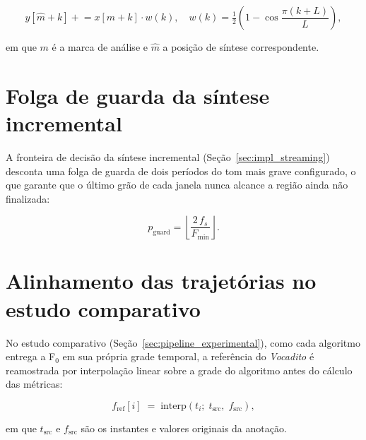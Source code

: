 \begin{equation}
y[\hat{m} + k] \mathrel{+}= x[m + k] \cdot w(k), \quad
w(k) = \tfrac{1}{2}\!\left(1 - \cos\!\frac{\pi(k+L)}{L}\right),
\end{equation}

\noindent em que $m$ é a marca de análise e $\hat{m}$ a posição de síntese
correspondente.

\section{\label{ap:guarda}Folga de guarda da síntese incremental}

A fronteira de decisão da síntese incremental (Seção~\ref{sec:impl_streaming})
desconta uma folga de guarda de dois períodos do tom mais grave configurado, o que
garante que o último grão de cada janela nunca alcance a região ainda não
finalizada:

\begin{equation}
p_{\text{guard}} = \left\lfloor \frac{2\, f_s}{F_{\min}} \right\rfloor .
\end{equation}

\section{\label{ap:alinhamento}Alinhamento das trajetórias no estudo comparativo}

No estudo comparativo (Seção~\ref{sec:pipeline_experimental}), como cada algoritmo
entrega a F$_0$ em sua própria grade temporal, a referência do \textit{Vocadito} é
reamostrada por interpolação linear sobre a grade do algoritmo antes do cálculo das
métricas:

\begin{equation}
\label{eq:alinhamento}
f_{\text{ref}}[i] \;=\; \mathrm{interp}\!\left(t_i;\; t_{\text{src}},\; f_{\text{src}}\right),
\end{equation}

\noindent em que $t_{\text{src}}$ e $f_{\text{src}}$ são os instantes e valores
originais da anotação.
